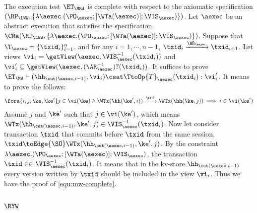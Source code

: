 The execution test $\ET_{\MRd}$ is complete with respect to 
the axiomatic specification $(\RP_{\LWW}, \{\lambda \aexec.(\PO_{\aexec} ; [\WTa(\aexec)] ; \VIS_{\aexec})\})$. 
Let $\aexec$ be an abstract execution that satisfies the specification
$\CMa(\RP_{\LWW}, \{\lambda \aexec.(\PO_{\aexec} ; [\WTa(\aexec)] ; \VIS_{\aexec})\})$.
Suppose that $\T_{\aexec} = \{\txid_{i}\}_{i=1}^{n}$, and for any $i=1,\cdots, n-1$, $\txid_{i} \xrightarrow{\AR_{\aexec}} 
\txid_{i+1}$.
Let views \( \vi_{i} = \getView(\aexec, \VIS^{-1}_{\aexec}(\txid_{i}) ) \) and \( \vi'_{i} \subseteq \getView(\aexec, (\AR^{-1}_{\aexec})?(\txid_{i}) ) \).
It suffices to prove \( \ET_\MW \vdash (\hh_{\cut(\aexec, i-1)}, \vi_i ) \csat  \TtoOp{T}_{\aexec}(\txid_{i}) : \vi'_{i} \).
It means to prove the follows:
\begin{equation}
\label{equ:mw-complete}
\begin{array}{@{}l@{}}
    \fora{i,j,\ke, \ke' } j \in \vi(\ke)
    \wedge \WTx(\hh(\ke', i)) \xrightarrow{\PO?} \WTx(\hh(\ke, j)) 
    \implies i \in \vi(\ke')
\end{array}
\end{equation}
Assume \( j \) and \( \ke' \) such that \( j \in \vi(\ke')\), which means \( \WTx(\hh_{\cut(\aexec, i-1)}, \ke', j) \in \VIS^{-1}_{\aexec}(\txid_{i}) \).
Now let consider transaction \( \txid \) that commits before \( \txid \) from the same session, \ie \( \txid \toEdge{\SO} \WTx(\hh_{\cut(\aexec, i-1)}, \ke', j) \).
By the constraint \( \lambda \aexec.(\PO_{\aexec} ; [\WTa(\aexec)] ; \VIS_{\aexec}) \), the transaction \( \txid \in \in \VIS^{-1}_{\aexec}(\txid_{i}) \).
It means that in the kv-store \(  \hh_{\cut(\aexec, i-1)} \) every version written by \( \txid \) should be included in the view \( \vi_i \).
Thus we have the proof of \cref{equ:mw-complete}.

\subsection{ \( \RYW \) }

